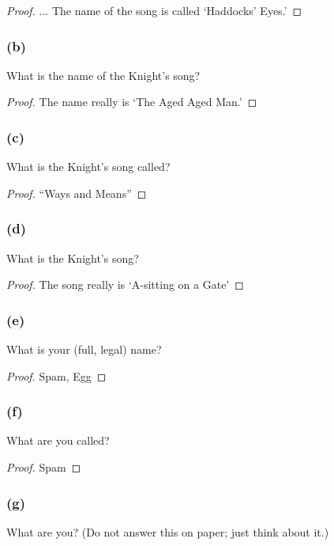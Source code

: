 \documentclass[14pt]{extarticle}
\begin{document}
\begin{proof}
        ... The name of the song is called ‘Haddocks’ Eyes.’
\end{proof}

\subsubsection{(b)}
What is the name of the Knight’s song?

\begin{proof}
        The name really is ‘The Aged Aged Man.’
\end{proof}

\subsubsection{(c)}
What is the Knight’s song called?

\begin{proof}
        “Ways and Means”
\end{proof}

\subsubsection{(d)}
What is the Knight’s song?

\begin{proof}
        The song really is ‘A-sitting on a Gate’
\end{proof}

\subsubsection{(e)}
What is your (full, legal) name?

\begin{proof}
        Spam, Egg
\end{proof}

\subsubsection{(f)}
What are you called?

\begin{proof}
        Spam
\end{proof}

\subsubsection{(g)}
What are you? (Do not answer this on paper; just think about it.)
\end{document}
